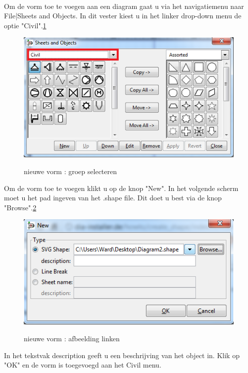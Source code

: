 \documentclass[12pt,a4paper]{report}
\begin{document}
\begin{flushleft}
\paragraph*{}
Om de vorm toe te voegen aan een diagram gaat u via het navigatiemenu naar File|Sheets and Objects. In dit vester kiest u in het linker drop-down menu de optie "Civil".\ref{shape_02}
\begin{figure}[H]
\includegraphics[scale=1]{images/shape_02.png}
\label{shape_02}
\centering
\vspace{-25pt}
\caption{nieuwe vorm : groep selecteren} 
\end{figure}
Om de vorm toe te voegen klikt u op de knop "New". In het volgende scherm moet u het pad ingeven van het .shape file. Dit doet u best via de knop "Browse".\ref{shape_03}
\begin{figure}[H]
\includegraphics[scale=1]{images/shape_03.png}
\label{shape_03}
\centering
\vspace{-10pt}
\caption{nieuwe vorm : afbeelding linken} 
\end{figure}
In het tekstvak description geeft u een beschrijving van het object in. Klik op "OK" en de vorm is toegevoegd aan het Civil menu.

\end{flushleft}
\end{document}
